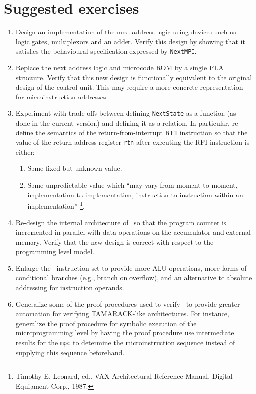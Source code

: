\section{Suggested exercises}
\label{sec-exer}

\begin{enumerate}

\item
Design an implementation of the next address logic
using devices such as logic gates,
multiplexors and an adder.
Verify this design by showing that it satisfies the
behavioural specification expressed by \verb"NextMPC".

\item
Replace the next address logic and microcode ROM by
a single PLA structure.
Verify that this new design is functionally equivalent
to the original design of the control unit.
This may require a more concrete representation for
microinstruction addresses.

\item
Experiment with trade-offs between defining \verb"NextState" as
a function (as done in the current version) and defining
it as a relation.
In particular,
re-define the semantics of
the return-from-interrupt RFI
instruction so that the value of the return address register \verb"rtn"
after executing the RFI instruction is either:

\begin{enumerate}
\item Some fixed but unknown value.
\item Some unpredictable value which
``may vary from moment to moment, implementation to
implementation, instruction to instruction within an implementation''
\footnote{
Timothy E. Leonard, ed.,
VAX Architectural Reference Manual, Digital Equipment Corp., 1987.}.
\end{enumerate}

\item
Re-design the internal architecture of \Tamarack\
so that the program counter is incremented in parallel with
data operations on the accumulator and external memory.
Verify that the new design is correct with respect to the
programming level model.

\item 
Enlarge the \Tamarack\ instruction set to provide more ALU operations,
more forms of conditional branches (e.g., branch on overflow),
and an alternative to absolute addressing for instruction operands.

\item
Generalize some of the proof procedures
used to verify \Tamarack\ to provide greater automation
for verifying \mbox{{\footnotesize TAMARACK}-like} architectures.
For instance, generalize the proof procedure for symbolic execution
of the microprogramming level by having the proof procedure use
intermediate results for the \verb"mpc" to determine the microinstruction
sequence instead of supplying this sequence beforehand.


\end{enumerate}
